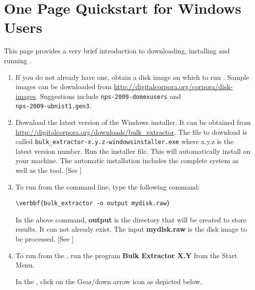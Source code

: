 \documentclass[11pt]{article} %
\begin{document}
\section*{One Page Quickstart for Windows Users}
This page provides a very brief introduction to downloading, installing and running \bulk. 
\begin{enumerate}
\item If you do not already have one, obtain a disk image on which to run \bulk. Sample images can be downloaded from \url{http://digitalcorpora.org/corpora/disk-images}. Suggestions include \texttt{nps-2009-domexusers} and \\ \texttt{nps-2009-ubnist1.gen3}.
\item Download the latest version of the \bulk Windows installer. It can be obtained from \url{http://digitalcorpora.org/downloads/bulk_extractor}. The file to download is called \texttt{bulk\_extractor-x.y.z-windowsinstaller.exe} where x.y.z is the latest version number.  Run the installer file. This will automatically install \bulk on your machine. The automatic installation includes the complete \bulk system as well as the \viewer tool. [See \textbf{} \textbf{}]

\item To run \bulk from the command line, type the following command:
\begin{Verbatim}[commandchars=\\\{\}]
\verbbf{bulk_extractor -o output mydisk.raw}
\end{Verbatim} 

In the above command, \textbf{output} is the directory that will be created to store \bulk results.  It can not already exist. The input \textbf{mydisk.raw} is the disk image to be processed.
[See  \textbf{} \textbf{}]

\item To run \bulk from the \viewer, run the program \textbf{Bulk Extractor X.Y} from the Start Menu. 

In the \viewer, click on the Gear/down arrow icon as depicted below. 
\noindent
\begin{minipage}{\linewidth}
\label{fig:runBulk2}
\end{minipage}


\end{enumerate}
\end{document}
